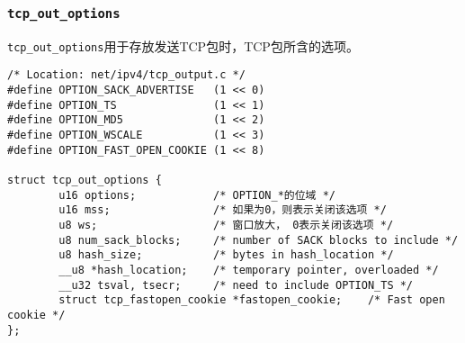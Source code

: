 \subsubsection{\texttt{tcp_out_options}}
\texttt{tcp_out_options}用于存放发送TCP包时，TCP包所含的选项。
\begin{verbatim}
/* Location: net/ipv4/tcp_output.c */
#define OPTION_SACK_ADVERTISE   (1 << 0)
#define OPTION_TS               (1 << 1)
#define OPTION_MD5              (1 << 2)
#define OPTION_WSCALE           (1 << 3)
#define OPTION_FAST_OPEN_COOKIE (1 << 8)

struct tcp_out_options {
        u16 options;            /* OPTION_*的位域 */
        u16 mss;                /* 如果为0，则表示关闭该选项 */
        u8 ws;                  /* 窗口放大， 0表示关闭该选项 */
        u8 num_sack_blocks;     /* number of SACK blocks to include */
        u8 hash_size;           /* bytes in hash_location */
        __u8 *hash_location;    /* temporary pointer, overloaded */
        __u32 tsval, tsecr;     /* need to include OPTION_TS */
        struct tcp_fastopen_cookie *fastopen_cookie;    /* Fast open cookie */
};
\end{verbatim}
